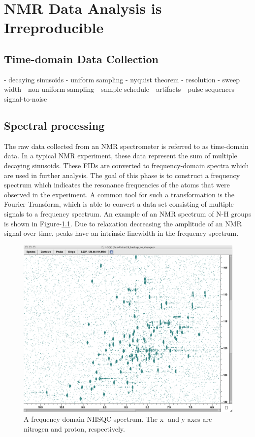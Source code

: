\chapter{NMR Data Analysis is Irreproducible}

\section{Time-domain Data Collection}
 - decaying sinusoids
 - uniform sampling
 - nyquist theorem
 - resolution
 - sweep width
 - non-uniform sampling
   - sample schedule
 - artifacts
 - pulse sequences
 - signal-to-noise


\section{Spectral processing}

The raw data collected from an NMR spectrometer is referred to as 
time-domain data.  In a typical NMR experiment, these data represent the 
sum of multiple decaying sinusoids.  These FIDs are converted to 
frequency-domain spectra which are used in further analysis.  The goal of 
this phase is to construct a frequency spectrum which indicates the resonance 
frequencies of the atoms that were observed in the experiment.  A common tool 
for such a transformation is the Fourier Transform, which is able to convert 
a data set consisting of multiple signals to a frequency spectrum.  
An example of an NMR spectrum of N-H groups is shown in Figure-\ref{nhsqc}.
Due to relaxation decreasing the amplitude of an NMR signal over time, peaks 
have an intrinsic linewidth in the frequency spectrum.

\begin{figure}
  \includegraphics[scale=0.35]{figures/nhsqc}
  \caption[A frequency-domain NHSQC spectrum]
          {A frequency-domain NHSQC spectrum. 
           The x- and y-axes are nitrogen and proton, respectively.}
  \label{nhsqc}
\end{figure}

